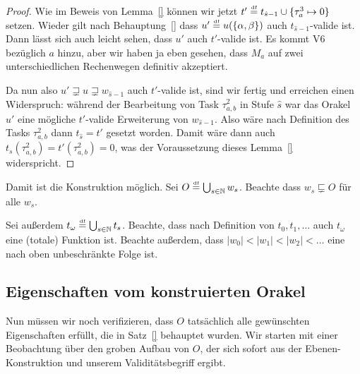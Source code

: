\begin{proof}
Wie im Beweis von Lemma~\ref{} können wir jetzt $t'\stackrel{\text{\smash{\tiny df}}}{=} t_{\hat{s}-1}\cup\{\tau^3_{a} \mapsto 0\}$ setzen.
Wieder gilt nach Behauptung~\ref{} dass $u'\stackrel{\text{\smash{\tiny df}}}{=} u(\{\alpha, \beta\})$ auch $t_{\hat{s}-1}$-valide ist.
Dann lässt sich auch leicht sehen, dass $u'$ auch $t'$-valide ist. Es kommt V6 bezüglich $a$ hinzu, aber wir haben ja eben gesehen, dass $M_a$ auf zwei unterschiedlichen Rechenwegen definitiv akzeptiert.

Da nun also $u'\sqsupsetneq u \sqsupsetneq w_{\hat{s}-1}$ auch $t'$-valide ist, sind wir fertig und erreichen einen Widerspruch: während der Bearbeitung von Task $\tau^2_{a,b}$ in Stufe $\hat{s}$ war das Orakel $u'$ eine mögliche $t'$-valide Erweiterung von $w_{\hat{s}-1}$. Also wäre nach Definition des Tasks $\tau^2_{a,b}$ dann $t_{\hat{s}}=t'$ gesetzt worden.
Damit wäre dann auch $t_{s}(\tau^2_{a,b})=t'(\tau^2_{a,b})=0$, was der Voraussetzung dieses Lemma~\ref{} widerspricht.
\end{proof}

Damit ist die Konstruktion möglich. Sei $O\stackrel{\text{\smash{\tiny df}}}{=} \bigcup_{s\in\mathbb N} w_s$.
Beachte dass $w_s\sqsubsetneq O$ für alle $w_s$.

Sei außerdem $t_\omega \stackrel{\text{\smash{\tiny df}}}{=} \bigcup_{s\in\mathbb N} t_s$. Beachte, dass nach Definition von $t_0, t_1, \dots$ auch $t_\omega$ eine (totale) Funktion ist.
Beachte außerdem, dass $|w_0|<|w_1|< |w_2|< \ldots$ eine nach oben unbeschränkte Folge ist.

\subsection*{Eigenschaften vom konstruierten Orakel}

Nun müssen wir noch verifizieren, dass $O$ tatsächlich alle gewünschten Eigenschaften erfüllt, die in Satz~\ref{} behauptet wurden.
Wir starten mit einer Beobachtung über den groben Aufbau von $O$, der sich sofort aus der Ebenen-Konstruktion und unserem Validitätsbegriff ergibt.

